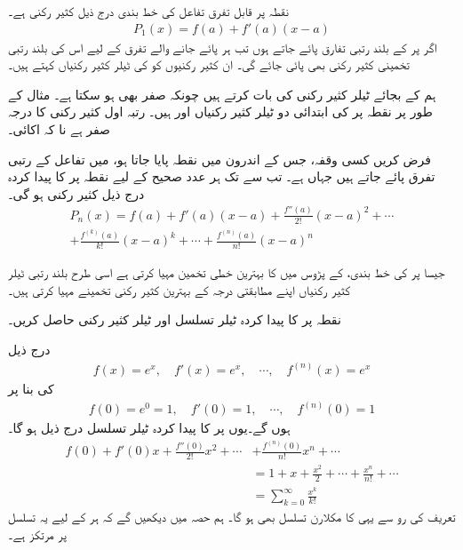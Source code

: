 نقطہ  پر قابل تفرق تفاعل  کی خط بندی درج ذیل کثیر رکنی ہے۔
\begin{align*}
P_1(x)=f(a)+f'(a)(x-a)
\end{align*} 
اگر  پر  کے بلند رتبی تفارق پائے جاتے ہوں تب ہر پائے جانے والے تفرق کے لیے  اس کی بلند رتبی تخمینی کثیر رکنی بھی پائی جائے گی۔  ان کثیر رکنیوں کو  کی ٹیلر کثیر رکنیاں کہتے ہیں۔

ہم   کے بجائے   ٹیلر کثیر رکنی کی بات کرتے ہیں چونکہ  صفر بھی ہو سکتا ہے۔ مثال کے طور پر نقطہ  پر  کی ابتدائی دو ٹیلر کثیر رکنیاں  اور  ہیں۔ رتبہ اول کثیر رکنی کا درجہ صفر ہے نا کہ اکائی۔

فرض کریں کسی وقفہ، جس کے  اندرون میں نقطہ  پایا جاتا ہو، میں تفاعل  کے  رتبی تفرق پائے جاتے ہیں جہاں  ہے۔ تب  سے  تک ہر عدد صحیح کے لیے نقطہ  پر  کا پیدا کردہ  درج ذیل کثیر رکنی ہو گی۔
\begin{multline*}
P_n(x)=f(a)+f'(a)(x-a)+\frac{f''(a)}{2!}(x-a)^2+\cdots\\
+\frac{f^{(k)}(a)}{k!}(x-a)^k+\cdots+\frac{f^{(n)}(a)}{n!}(x-a)^n
\end{multline*}

جیسا  پر  کی خط بندی،  کے پڑوس میں  کا   بہترین خطی تخمین مہیا کرتی ہے اسی طرح بلند رتبی ٹیلر کثیر رکنیاں اپنے  مطابقتی درجہ  کے بہترین کثیر رکنی  تخمینے  مہیا کرتی ہیں۔

نقطہ  پر  کا پیدا کردہ ٹیلر تسلسل اور ٹیلر کثیر رکنی حاصل کریں۔

درج ذیل
\begin{align*}
f(x)=e^x,\quad f'(x)=e^x,\quad \cdots, \quad f^{(n)}(x)=e^x
\end{align*}
کی بنا پر  
\begin{align*}
f(0)=e^0=1,\quad f'(0)=1,\quad \cdots, \quad f^{(n)}(0)=1
\end{align*}
ہوں گے۔یوں  پر  کا پیدا کردہ ٹیلر تسلسل درج ذیل ہو گا۔
\begin{align*}
f(0)+f'(0)x+\frac{f''(0)}{2!}x^2+\cdots &+\frac{f^{(n)}(0)}{n!}x^n+\cdots\\
&=1+x+\frac{x^2}{2}+\cdots+\frac{x^n}{n!}+\cdots\\
&=\sum_{k=0}^{\infty}\frac{x^k}{k!}
\end{align*}
تعریف کی رو سے یہی  کا مکلارن تسلسل بھی ہو گا۔ ہم حصہ  میں دیکھیں گے کہ ہر  کے لیے یہ تسلسل  پر مرتکز ہے۔ 

